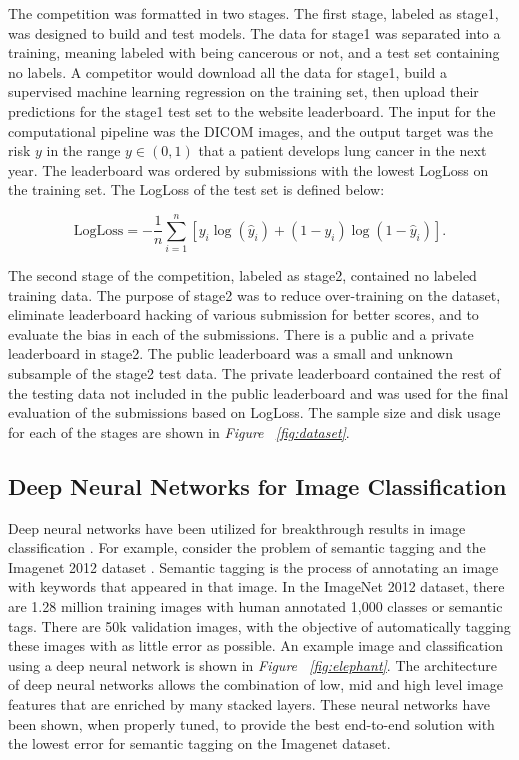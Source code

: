 \documentclass[conference,11pt]{IEEEtran}
\begin{document}
The competition was formatted in two stages. The first stage, labeled as stage1, was designed to build and test models. The data for stage1 was separated into a training, meaning labeled with being cancerous or not, and a test set containing no labels. A competitor would download all the data for stage1, build a supervised machine learning regression on the training set, then upload their predictions for the stage1 test set to the website leaderboard. The input for the computational pipeline was the DICOM images, and the output target was the risk $y$ in the range $y \in (0,1)$ that a patient develops lung cancer in the next year. The leaderboard was ordered by submissions with the lowest LogLoss on the training set. The LogLoss of the test set is defined below:

$$ \textrm{LogLoss} = - \frac{1}{n} \sum_{i=1}^n \left[ y_i \log(\hat{y}_i) + (1 - y_i) \log(1 - \hat{y}_i)\right]. $$

The second stage of the competition, labeled as stage2, contained no labeled training data. The purpose of stage2 was to reduce over-training on the dataset, eliminate leaderboard hacking of various submission for better scores, and to evaluate the bias in each of the submissions. There is a public and a private leaderboard in stage2. The public leaderboard was a small and unknown subsample of the stage2 test data. The private leaderboard contained the rest of the testing data not included in the public leaderboard and was used for the final evaluation of the submissions based on LogLoss. The sample size and disk usage for each of the stages are shown in \textit{Figure ~\ref{fig:dataset}}.

\subsection{Deep Neural Networks for Image Classification}

Deep neural networks have been utilized for breakthrough results in image classification \cite{he_deep_2015}. For example, consider the problem of semantic tagging and the Imagenet 2012 dataset \cite{russakovsky_imagenet_2015}. Semantic tagging is the process of annotating an image with keywords that appeared in that image. In the ImageNet 2012 dataset,  there are 1.28 million training images with human annotated 1,000 classes or semantic tags. There are 50k validation images, with the objective of automatically tagging these images with as little error as possible. An example image and classification using a deep neural network is shown in \textit{Figure ~\ref{fig:elephant}}.  The architecture of deep neural networks allows the combination of low, mid and high level image features that are enriched by many stacked layers. These neural networks have been shown, when properly tuned, to provide the best end-to-end solution with the lowest error for semantic tagging on the Imagenet dataset. 
\end{document}
